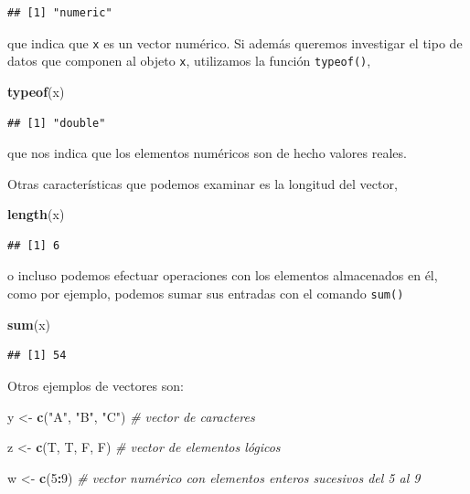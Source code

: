\documentclass[
]{book}
\newenvironment{Shaded}{\begin{snugshade}}{\end{snugshade}}
\newcommand{\CommentTok}[1]{\textcolor[rgb]{0.56,0.35,0.01}{\textit{#1}}}
\newcommand{\DecValTok}[1]{\textcolor[rgb]{0.00,0.00,0.81}{#1}}
\newcommand{\FunctionTok}[1]{\textcolor[rgb]{0.13,0.29,0.53}{\textbf{#1}}}
\newcommand{\NormalTok}[1]{#1}
\newcommand{\OtherTok}[1]{\textcolor[rgb]{0.56,0.35,0.01}{#1}}
\newcommand{\SpecialCharTok}[1]{\textcolor[rgb]{0.81,0.36,0.00}{\textbf{#1}}}
\newcommand{\StringTok}[1]{\textcolor[rgb]{0.31,0.60,0.02}{#1}}
\begin{document}
\begin{verbatim}
## [1] "numeric"
\end{verbatim}

que indica que \texttt{x} es un vector numérico. Si además queremos investigar el tipo de datos que componen al objeto \texttt{x}, utilizamos la función \texttt{typeof()},

\begin{Shaded}
\begin{Highlighting}[]
\FunctionTok{typeof}\NormalTok{(x)}
\end{Highlighting}
\end{Shaded}

\begin{verbatim}
## [1] "double"
\end{verbatim}

que nos indica que los elementos numéricos son de hecho valores reales.

Otras características que podemos examinar es la longitud del vector,

\begin{Shaded}
\begin{Highlighting}[]
\FunctionTok{length}\NormalTok{(x)}
\end{Highlighting}
\end{Shaded}

\begin{verbatim}
## [1] 6
\end{verbatim}

o incluso podemos efectuar operaciones con los elementos almacenados en él, como por ejemplo, podemos sumar sus entradas con el comando \texttt{sum()}

\begin{Shaded}
\begin{Highlighting}[]
\FunctionTok{sum}\NormalTok{(x)}
\end{Highlighting}
\end{Shaded}

\begin{verbatim}
## [1] 54
\end{verbatim}

Otros ejemplos de vectores son:

\begin{Shaded}
\begin{Highlighting}[]
\NormalTok{y }\OtherTok{\textless{}{-}} \FunctionTok{c}\NormalTok{(}\StringTok{"A"}\NormalTok{, }\StringTok{"B"}\NormalTok{, }\StringTok{"C"}\NormalTok{) }\CommentTok{\# vector de caracteres}

\NormalTok{z }\OtherTok{\textless{}{-}} \FunctionTok{c}\NormalTok{(T, T, F, F) }\CommentTok{\# vector de elementos lógicos}

\NormalTok{w }\OtherTok{\textless{}{-}} \FunctionTok{c}\NormalTok{(}\DecValTok{5}\SpecialCharTok{:}\DecValTok{9}\NormalTok{) }\CommentTok{\# vector numérico con elementos enteros sucesivos del 5 al 9}
\end{Highlighting}
\end{Shaded}
\end{document}
